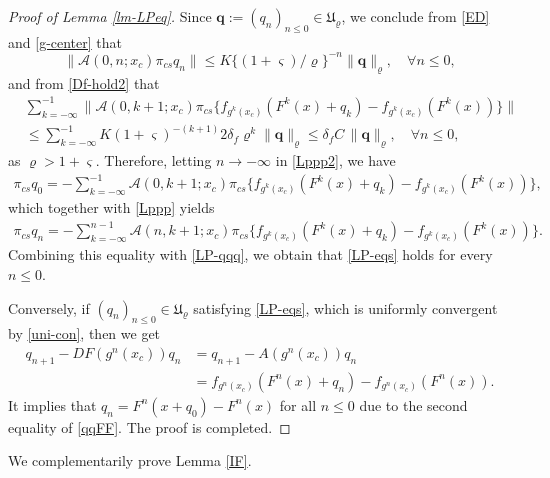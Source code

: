 \documentclass[reqno]{amsart}
\numberwithin{equation}{section}
\begin{document}
\begin{proof}[Proof of Lemma \ref{lm-LPeq}]
Since $\mathbf{q}:=(q_n)_{n\le 0}\in\mathfrak{U}_\varrho$, we conclude from \eqref{ED} and \eqref{g-center} that
$$
\|\mathcal{A}(0,n;x_c)\pi_{cs} q_n\| \le K \{(1+\varsigma)/\varrho\}^{-n} \|\mathbf{q}\|_{\varrho},\quad \forall n\le 0,
$$
and from \eqref{Df-hold2} that
\begin{align}\label{uni-con}
&\sum_{k=-\infty}^{-1}  \| \mathcal{A}(0,k+1;x_c) \pi_{cs} \{f_{g^k(x_c)}(F^k(x)+q_k)-f_{g^k(x_c)}(F^k(x))\} \|
\nonumber\\
&\le \sum_{k=-\infty}^{-1} K (1+\varsigma)^{-(k+1)} 2\delta_f \varrho^k \|\mathbf{q}\|_{\varrho}
\le  \delta_f C \, \|\mathbf{q}\|_{\varrho},\quad \forall n\le 0,
\end{align}
as $\varrho>1+\varsigma$.
Therefore, letting $n\to -\infty$ in \eqref{Lppp2}, we have
\begin{align}\label{qq00}
\pi_{cs}q_0 =-\sum_{k=-\infty}^{-1} \mathcal{A}(0,k+1;x_c)
\pi_{cs}
\{f_{g^k(x_c)}(F^k(x)+q_k)-f_{g^k(x_c)}(F^k(x))\},
\end{align}
which together with \eqref{Lppp} yields
\begin{align*}
\pi_{cs} q_n =-\sum_{k=-\infty}^{n-1}  \mathcal{A}(n,k+1;x_c)
\pi_{cs}
\{f_{g^k(x_c)}(F^k(x)+q_k)-f_{g^k(x_c)}(F^k(x))\}.
\end{align*}
Combining this equality with \eqref{LP-qqq}, we obtain that \eqref{LP-eqs} holds for every $n\le 0$.


Conversely, if $(q_n)_{n\le 0}\in\mathfrak{U}_\varrho$ satisfying \eqref{LP-eqs}, which is uniformly convergent by \eqref{uni-con}, then we get
\begin{align*}
q_{n+1}-DF(g^{n}(x_c))q_{n}
&=q_{n+1}-A(g^{n}(x_c))q_{n}
\\
&=
f_{g^n(x_c)}(F^n(x)+q_n)-f_{g^n(x_c)}(F^n(x)).
\end{align*}
It implies that $q_n=F^n(x+q_0)- F^n(x)$ for all $n\le 0$ due to the second equality of \eqref{qqFF}. The proof is completed.
\end{proof}

We complementarily prove Lemma \ref{IF}.
\end{document}

